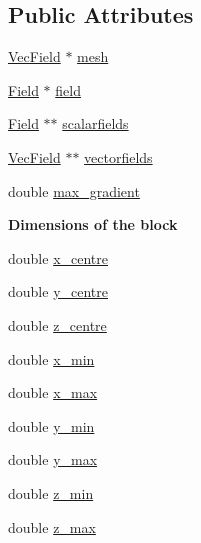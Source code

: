 \subsection*{Public Attributes}
\begin{DoxyCompactItemize}
\item 
\hyperlink{classmy_octree_1_1_vec_field}{Vec\+Field} $\ast$ \hyperlink{classmy_octree_1_1_block_aef557ded62cd3b3441861a98e0a43a9d}{mesh}
\item 
\hyperlink{classmy_octree_1_1_field}{Field} $\ast$ \hyperlink{classmy_octree_1_1_block_a20b33a3f7704a87de6ceec6efa98edfd}{field}
\item 
\hyperlink{classmy_octree_1_1_field}{Field} $\ast$$\ast$ \hyperlink{classmy_octree_1_1_block_a0bac722408089bfe10dbdf2d8f5fe7bd}{scalarfields}
\item 
\hyperlink{classmy_octree_1_1_vec_field}{Vec\+Field} $\ast$$\ast$ \hyperlink{classmy_octree_1_1_block_ad8c28f5d7cd66ac20dc34643d821ce3b}{vectorfields}
\item 
double \hyperlink{classmy_octree_1_1_block_ad2e19ba33e0303906c6edca9344224e4}{max\+\_\+gradient}
\end{DoxyCompactItemize}
\begin{Indent}{\bf Dimensions of the block}\par
\begin{DoxyCompactItemize}
\item 
double \hyperlink{classmy_octree_1_1_block_a568b599d56f024effe48021075cdde64}{x\+\_\+centre}
\item 
double \hyperlink{classmy_octree_1_1_block_a1bddbdf912bda6409ed258be0fccde22}{y\+\_\+centre}
\item 
double \hyperlink{classmy_octree_1_1_block_a02aab304587fe213b1dd3d0a10e7ea82}{z\+\_\+centre}
\item 
double \hyperlink{classmy_octree_1_1_block_a333185a8f7b5f2b4f425e08459caeca4}{x\+\_\+min}
\item 
double \hyperlink{classmy_octree_1_1_block_a2d236fad939b4acef0fec4fedfcef128}{x\+\_\+max}
\item 
double \hyperlink{classmy_octree_1_1_block_ad06319c48ab631b16b7b4b678d7c5d0e}{y\+\_\+min}
\item 
double \hyperlink{classmy_octree_1_1_block_a1e3c4b1935a5652e29c8b874c8075145}{y\+\_\+max}
\item 
double \hyperlink{classmy_octree_1_1_block_a8fe6cf2861bc5b7c3235cafcb4e33f35}{z\+\_\+min}
\item 
double \hyperlink{classmy_octree_1_1_block_ac3a69cabd6ecedfcea7ccc5b52f32a1d}{z\+\_\+max}
\end{DoxyCompactItemize}
\end{Indent}
